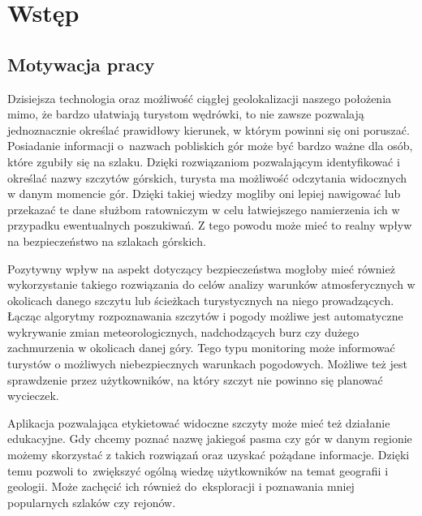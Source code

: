 \newpage %

\section{Wstęp}

\subsection{Motywacja pracy}

Dzisiejsza technologia oraz możliwość ciągłej geolokalizacji naszego położenia mimo, że bardzo ułatwiają turystom wędrówki, to nie zawsze pozwalają jednoznacznie określać prawidłowy kierunek, w którym powinni się oni poruszać. Posiadanie informacji o~nazwach pobliskich gór może być bardzo ważne dla osób, które zgubiły się na szlaku. Dzięki rozwiązaniom pozwalającym identyfikować i określać nazwy szczytów górskich, turysta ma możliwość odczytania widocznych w danym momencie gór. Dzięki takiej wiedzy mogliby oni lepiej nawigować lub przekazać te dane służbom ratowniczym w celu łatwiejszego namierzenia ich w przypadku ewentualnych poszukiwań. Z tego powodu może mieć to realny wpływ na bezpieczeństwo na szlakach górskich.

\par

Pozytywny wpływ na aspekt dotyczący bezpieczeństwa mogłoby mieć również wykorzystanie takiego rozwiązania do celów analizy warunków atmosferycznych w okolicach danego szczytu lub ścieżkach turystycznych na niego prowadzących. Łącząc algorytmy rozpoznawania szczytów i pogody możliwe jest automatyczne wykrywanie zmian meteorologicznych, nadchodzących burz czy dużego zachmurzenia w okolicach danej góry. Tego typu monitoring może informować turystów o możliwych niebezpiecznych warunkach pogodowych. Możliwe też jest sprawdzenie przez użytkowników, na który szczyt nie powinno się planować wycieczek.

\par

Aplikacja pozwalająca etykietować widoczne szczyty może mieć też działanie edukacyjne. Gdy chcemy poznać nazwę jakiegoś pasma czy gór w danym regionie możemy skorzystać z takich rozwiązań oraz uzyskać pożądane informacje. Dzięki temu pozwoli to~zwiększyć ogólną wiedzę użytkowników na temat geografii i geologii. Może zachęcić ich również do~eksploracji i poznawania mniej popularnych szlaków czy rejonów.

\par

